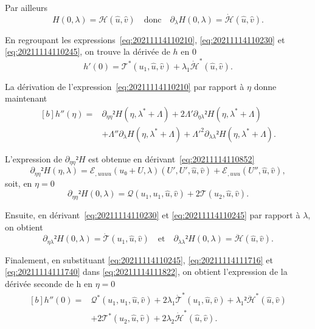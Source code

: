 \documentclass[12pt, final]{amsart}
\begin{document}
Par ailleurs
\begin{equation}
  \label{eq:20211114110245}
  H(0, \lambda)=\mathcal H(\hat{u}, \hat{v})
  \quad\text{donc}\quad
  \partial_\lambda H(0, \lambda)=\dot{\mathcal H}(\hat{u}, \hat{v}).
\end{equation}

En regroupant les expressions~\eqref{eq:20211114110210},
\eqref{eq:20211114110230} et \eqref{eq:20211114110245}, on trouve la dérivée de
\(h\) en 0
\begin{equation}
  h'(0)=\mathcal T^\ast(u_1, \hat{u}, \hat{v})
  +\lambda_1\dot{\mathcal H}^\ast(\hat{u}, \hat{v}).
\end{equation}

La dérivation de l'expression~\eqref{eq:20211114110210} par rapport à \(η\)
donne maintenant
\begin{equation}
  \label{eq:20211114111822}
  \begin{aligned}[b]
    h''(η)={}&\partial_{ηη}² H(η, \lambda^\ast+\Lambda)
    +2\Lambda'\partial_{η\lambda}² H(η, \lambda^\ast+\Lambda)\\
    &+\Lambda''\partial_{\lambda}H(η, \lambda^\ast+\Lambda)
    +\Lambda'^2\partial_{\lambda\lambda}²H(η, \lambda^\ast+\Lambda).
  \end{aligned}
\end{equation}

L'expression de \(\partial_{ηη}²H\) est obtenue en
dérivant~\eqref{eq:20211114110852}
\begin{equation}
  \partial_{ηη}²H(η, \lambda)
  =ℰ_{,uuuu}(u₀+U, \lambda)(U', U', \hat{u}, \hat{v})
  +ℰ_{,uuu}(U'', \hat{u}, \hat{v}),
\end{equation}
soit, en \(η=0\)
\begin{equation}
  \label{eq:20211114111716}
  \partial_{ηη}²H(0, \lambda)=\mathcal Q(u_1, u_1, \hat{u}, \hat{v})
  +2\mathcal T(u_2, \hat{u}, \hat{v}).
\end{equation}

Ensuite, en dérivant~\eqref{eq:20211114110230} et \eqref{eq:20211114110245} par
rapport à \(\lambda\), on obtient
\begin{equation}
  \label{eq:20211114111740}
  \partial_{η\lambda}²H(0, \lambda)=\dot{\mathcal T}(u_1, \hat{u}, \hat{v})
  \quad\text{et}\quad
  \partial_{\lambda\lambda}²H(0, \lambda)=\ddot{\mathcal H}(\hat{u}, \hat{v}).
\end{equation}

Finalement, en substituant \eqref{eq:20211114110245}, \eqref{eq:20211114111716}
et \eqref{eq:20211114111740} dans \eqref{eq:20211114111822}, on obtient
l'expression de la dérivée seconde de h en \(η=0\)
\begin{equation}
  \begin{aligned}[b]
    h''(0)={}&\mathcal Q^\ast(u_1, u_1, \hat{u}, \hat{v})
    +2\lambda_1\dot{\mathcal T}^\ast(u_1, \hat{u}, \hat{v})
    +\lambda_1²\ddot{\mathcal H}^\ast(\hat{u}, \hat{v})\\
    &+2\mathcal T^\ast(u_2, \hat{u}, \hat{v})
    +2\lambda_2\dot{\mathcal H}^\ast(\hat{u}, \hat{v}).
  \end{aligned}
\end{equation}
\end{document}
